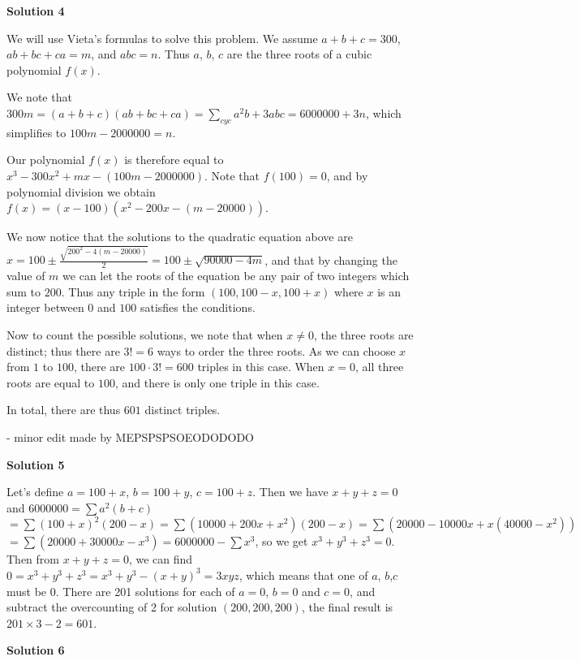 \begin{enumerate}
\textbf{Solution 4}

We will use Vieta's formulas to solve this problem. We assume $a + b + c = 300$, $ab + bc + ca = m$, and $abc = n$. Thus $a$, $b$, $c$ are the three roots of a cubic polynomial $f(x)$.

 We note that $300m = (a + b + c)(ab + bc + ca)=\sum_{cyc} a^2b + 3abc = 6000000 + 3n$, which simplifies to $100m - 2000000 = n$.

 Our polynomial $f(x)$ is therefore equal to $x^3 - 300x^2 + mx - (100m - 2000000)$. Note that $f(100) = 0$, and by polynomial division we obtain $f(x) = (x - 100)(x^2 - 200x - (m-20000))$.

 We now notice that the solutions to the quadratic equation above are $x = 100 \pm \frac{\sqrt{200^2 - 4(m - 20000)}}{2} = 100 \pm \sqrt{90000 - 4m}$, and that by changing the value of $m$ we can let the roots of the equation be any pair of two integers which sum to $200$. Thus any triple in the form $(100, 100 - x, 100 + x)$ where $x$ is an integer between $0$ and $100$ satisfies the conditions.

 Now to count the possible solutions, we note that when $x \ne 0$, the three roots are distinct; thus there are $3! = 6$ ways to order the three roots. As we can choose $x$ from $1$ to $100$, there are $100 \cdot 3! = 600$ triples in this case. When $x = 0$, all three roots are equal to $100$, and there is only one triple in this case.

 In total, there are thus $\boxed{601}$ distinct triples.

 - minor edit made by MEPSPSPSOEODODODO

 



\textbf{Solution 5}

Let's define $a=100+x$, $b=100+y$, $c=100+z$. Then we have $x+y+z=0$ and $6000000 = \sum a^2(b+c)$
$= \sum (100+x)^2(200-x) = \sum (10000+200x+x^2)(200-x) = \sum (20000 - 10000 x + x(40000-x^2))$
$= \sum (20000 + 30000 x -x^3) = 6000000 - \sum x^3$, so we get $x^3 + y^3 + z^3 = 0$. Then from $x+y+z = 0$, we can find $0 = x^3+y^3+z^3 = x^3+y^3-(x+y)^3 = 3xyz$, which means that one of $a$, $b$,$c$ must be 0. There are 201 solutions for each of $a=0$, $b=0$ and $c=0$, and subtract the overcounting of 2 for solution $(200, 200, 200)$, the final result is $201 \times 3 - 2 = \boxed{601}$.

 



\textbf{Solution 6}


\end{enumerate}
